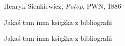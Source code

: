 \documentclass[12pt]{article}
\begin{document}
\begin{thebibliography}{5}
Henryk Sienkiewicz,
\emph{Potop},
PWN,
1886

Jakaś tam inna książka z bibliografii

Jakaś tam inna książka z bibliografii

\end{thebibliography}
\end{document}
